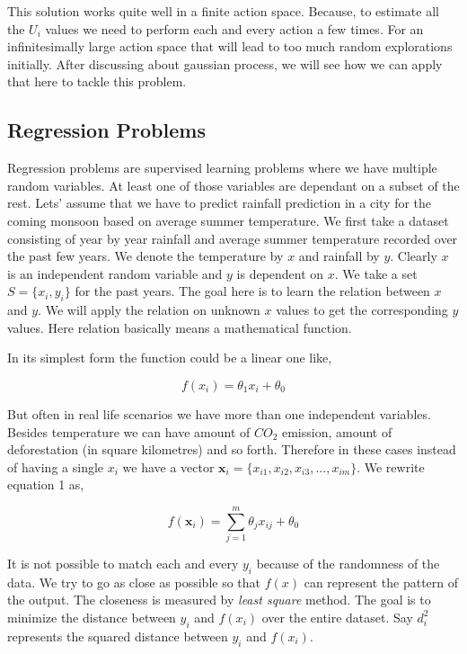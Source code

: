 \documentclass[english]{tktltiki}
\begin{document}
This solution works quite well in a finite action space. Because, to estimate all the $U_i$ values we need to perform each and every action a few times. For an infinitesimally large action space that will lead to too much random explorations initially. After discussing about gaussian process, we will see how we can apply that here to tackle this problem.


\subsection{Regression Problems}

Regression problems are supervised learning problems where we have multiple random variables. At least one of those variables are dependant on a subset of the rest. Lets' assume that we have to predict rainfall prediction in a city for the coming monsoon based on average summer temperature. We first take a dataset consisting of year by year rainfall and average summer temperature recorded over the past few years. We denote the temperature by $x$ and rainfall by $y$. Clearly $x$ is an independent random variable and $y$ is dependent on $x$. We take a set $S = \{x_i, y_i\}$ for the past years. The goal here is to learn the relation between $x$ and $y$. We will apply the relation on unknown $x$ values to get the corresponding $y$ values. Here relation basically means a mathematical function.

In its simplest form the function could be a linear one like,

\begin{equation}
f(x_i) = \theta_1 x_i + \theta_0
\end{equation}


But often in real life scenarios we have more than one independent variables. Besides temperature we can have amount of $CO_2$ emission, amount of deforestation (in square kilometres) and so forth. Therefore in these cases instead of having a single $x_i$ we have a vector $\mathbf{x}_i = \{x_{i1}, x_{i2}, x_{i3}, ..., x_{im}\}$. We rewrite equation 1 as,

\begin{equation}
f(\mathbf{x}_i) = \sum_{j=1}^m \theta_j x_{ij} + \theta_0
\end{equation}

It is not possible to match each and every $y_i$ because of the randomness of the data. We try to go as close as possible so that $f(x)$ can represent the pattern of the output. The closeness is measured by \textit{least square} method. The goal is to minimize the distance between $y_i$ and $f(x_i)$ over the entire dataset. Say $d^2_i$ represents the squared distance between $y_i$ and $f(x_i)$.
\end{document}
